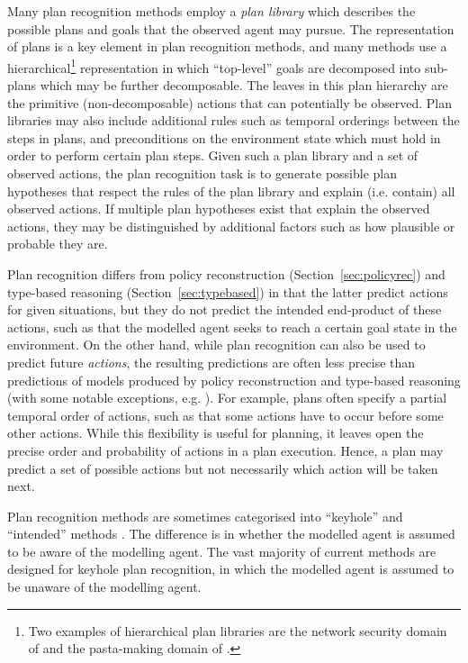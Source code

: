 \documentclass[final,1p,times,authoryear]{elsarticle}
\begin{document}
Many plan recognition methods employ a \emph{plan library} which describes the possible plans and goals that the observed agent may pursue. The representation of plans is a key element in plan recognition methods, and many methods use a hierarchical\footnote{Two examples of hierarchical plan libraries are the network security domain of \citet{gg2009} and the pasta-making domain of \citet{ka1986}.} representation in which ``top-level'' goals are decomposed into sub-plans which may be further decomposable. The leaves in this plan hierarchy are the primitive (non-decomposable) actions that can potentially be observed. Plan libraries may also include additional rules such as temporal orderings between the steps in plans, and preconditions on the environment state which must hold in order to perform certain plan steps. Given such a plan library and a set of observed actions, the plan recognition task is to generate possible plan hypotheses that respect the rules of the plan library and explain (i.e. contain) all observed actions. If multiple plan hypotheses exist that explain the observed actions, they may be distinguished by additional factors such as how plausible or probable they are.

Plan recognition differs from policy reconstruction (Section~\ref{sec:policyrec}) and type-based reasoning (Section~\ref{sec:typebased}) in that the latter predict actions for given situations, but they do not predict the intended end-product of these actions, such as that the modelled agent seeks to reach a certain goal state in the environment. On the other hand, while plan recognition can also be used to predict future \emph{actions}, the resulting predictions are often less precise than predictions of models produced by policy reconstruction and type-based reasoning (with some notable exceptions, e.g. \citet{bvw2002}). For example, plans often specify a partial temporal order of actions, such as that some actions have to occur before some other actions. While this flexibility is useful for planning, it leaves open the precise order and probability of actions in a plan execution. Hence, a plan may predict a set of possible actions but not necessarily which action will be taken next.

Plan recognition methods are sometimes categorised into ``keyhole'' and ``intended'' methods \citep{cpa1981}. The difference is in whether the modelled agent is assumed to be aware of the modelling agent. The vast majority of current methods are designed for keyhole plan recognition, in which the modelled agent is assumed to be unaware of the modelling agent.
\end{document}
